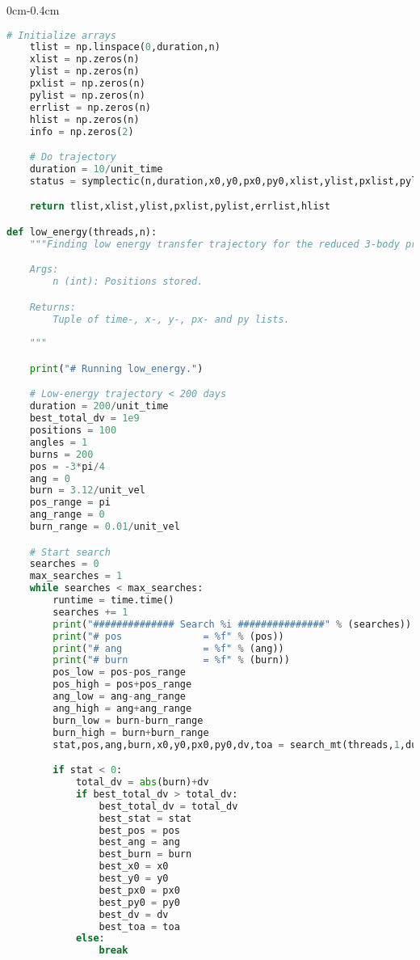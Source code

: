\begin{adjustwidth*}{0cm}{-0.4cm}
\begin{lstlisting}[language=Python]
    # Initialize arrays
    tlist = np.linspace(0,duration,n)
    xlist = np.zeros(n)
    ylist = np.zeros(n)
    pxlist = np.zeros(n)
    pylist = np.zeros(n)
    errlist = np.zeros(n)
    hlist = np.zeros(n)
    info = np.zeros(2)

    # Do trajectory
    duration = 10/unit_time
    status = symplectic(n,duration,x0,y0,px0,py0,xlist,ylist,pxlist,pylist,errlist,hlist,info)

    return tlist,xlist,ylist,pxlist,pylist,errlist,hlist

def low_energy(threads,n):
    """Finding low energy transfer trajectory for the reduced 3-body problem.

    Args:
        n (int): Positions stored.

    Returns:
        Tuple of time-, x-, y-, px- and py lists.
    
    """

    print("# Running low_energy.")

    # Low-energy trajectory < 200 days
    duration = 200/unit_time
    best_total_dv = 1e9
    positions = 100
    angles = 1
    burns = 200
    pos = -3*pi/4
    ang = 0
    burn = 3.12/unit_vel
    pos_range = pi
    ang_range = 0
    burn_range = 0.01/unit_vel

    # Start search
    searches = 0
    max_searches = 1
    while searches < max_searches:
        runtime = time.time()
        searches += 1
        print("############## Search %i ###############" % (searches))
        print("# pos              = %f" % (pos))
        print("# ang              = %f" % (ang))
        print("# burn             = %f" % (burn))
        pos_low = pos-pos_range
        pos_high = pos+pos_range
        ang_low = ang-ang_range
        ang_high = ang+ang_range
        burn_low = burn-burn_range
        burn_high = burn+burn_range
        stat,pos,ang,burn,x0,y0,px0,py0,dv,toa = search_mt(threads,1,duration,positions,angles,burns,pos_low,pos_high,ang_low,ang_high,burn_low,burn_high)

        if stat < 0:
            total_dv = abs(burn)+dv
            if best_total_dv > total_dv:
                best_total_dv = total_dv
                best_stat = stat
                best_pos = pos
                best_ang = ang
                best_burn = burn
                best_x0 = x0
                best_y0 = y0
                best_px0 = px0
                best_py0 = py0
                best_dv = dv
                best_toa = toa
            else:
                break


\end{lstlisting}
\end{adjustwidth*}

